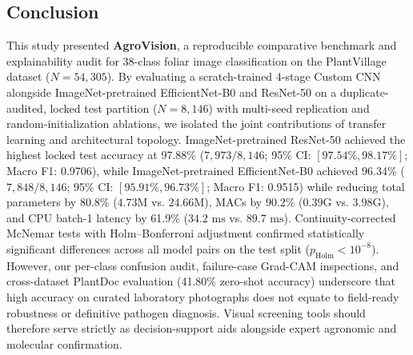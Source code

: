 \documentclass[journal]{IEEEtran}
\begin{document}
\subsection{Conclusion}
This study presented \textbf{AgroVision}, a reproducible comparative benchmark and explainability audit for 38-class foliar image classification on the PlantVillage dataset ($N = 54,305$). By evaluating a scratch-trained 4-stage Custom CNN alongside ImageNet-pretrained EfficientNet-B0 and ResNet-50 on a duplicate-audited, locked test partition ($N = 8,146$) with multi-seed replication and random-initialization ablations, we isolated the joint contributions of transfer learning and architectural topology. ImageNet-pretrained ResNet-50 achieved the highest locked test accuracy at 97.88\% ($7,973 / 8,146$; 95\% CI: $[97.54\%, 98.17\%]$; Macro F1: 0.9706), while ImageNet-pretrained EfficientNet-B0 achieved 96.34\% ($7,848 / 8,146$; 95\% CI: $[95.91\%, 96.73\%]$; Macro F1: 0.9515) while reducing total parameters by 80.8\% ($4.73\text{M}$ vs. $24.66\text{M}$), MACs by 90.2\% ($0.39\text{G}$ vs. $3.98\text{G}$), and CPU batch-1 latency by 61.9\% ($34.2\text{ ms}$ vs. $89.7\text{ ms}$). Continuity-corrected McNemar tests with Holm--Bonferroni adjustment confirmed statistically significant differences across all model pairs on the test split ($p_{\text{Holm}} < 10^{-8}$). However, our per-class confusion audit, failure-case Grad-CAM inspections, and cross-dataset PlantDoc evaluation (41.80\% zero-shot accuracy) underscore that high accuracy on curated laboratory photographs does not equate to field-ready robustness or definitive pathogen diagnosis. Visual screening tools should therefore serve strictly as decision-support aids alongside expert agronomic and molecular confirmation.
\end{document}
